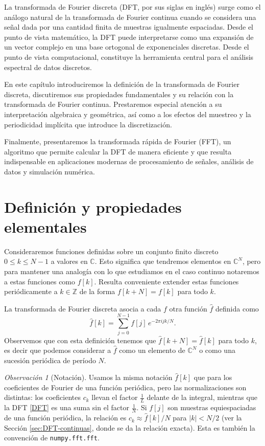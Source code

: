 \documentclass[12pt, a4paper]{amsbook}
\newcommand{\Z}{{\mathbb Z}}
\newcommand{\C}{{\mathbb C}}
\theoremstyle{remark}
\newtheorem{obs}[teo]{Observación}
\theoremstyle{definition}
\numberwithin{section}{chapter}
\numberwithin{subsection}{section}
\numberwithin{equation}{section}
\numberwithin{figure}{chapter}
\begin{document}
La transformada de Fourier discreta (DFT, por sus siglas en inglés) surge como el análogo natural de la transformada de Fourier continua cuando se considera una señal dada por una cantidad finita de muestras igualmente espaciadas. Desde el punto de vista matemático, la DFT puede interpretarse como una expansión de un vector complejo en una base ortogonal de exponenciales discretas. Desde el punto de vista computacional, constituye la herramienta central para el análisis espectral de datos discretos.

En este capítulo introduciremos la definición de la transformada de Fourier discreta, discutiremos sus propiedades fundamentales y su relación con la transformada de Fourier continua. Prestaremos especial atención a su interpretación algebraica y geométrica, así como a los efectos del muestreo y la periodicidad implícita que introduce la discretización.

Finalmente, presentaremos la transformada rápida de Fourier (FFT), un algoritmo que permite calcular la DFT de manera eficiente y que resulta indispensable en aplicaciones modernas de procesamiento de señales, análisis de datos y simulación numérica.

\section{Definición y propiedades elementales}


Consideraremos funciones definidas sobre un conjunto finito discreto $0\le k\le N-1$ a valores en $\C$. Esto significa que tendremos elementos en $\C^N$, pero para mantener una analogía con lo que estudiamos en el caso continuo notaremos a estas funciones como $f[k]$. Resulta conveniente extender estas funciones periódicamente a $k\in\Z$ de la forma $f[k+N]=f[k]$ para todo $k$.

La transformada de Fourier discreta asocia a cada $f$ otra función $\hat f$ definida como
\begin{equation}\label{DFT}
\hat f[k] = \sum_{j=0}^{N-1} f[j]\, e^{-2\pi i jk/N}.
\end{equation}
Observemos que con esta definición tenemos que $\hat f[k+N] = \hat f[k]$ para todo $k$, es decir que podemos considerar a $\hat f$ como un elemento de $\C^N$ o como una sucesión periódica de período $N$.

\begin{obs}[Notación]
Usamos la misma notación $\hat f[k]$ que para los coeficientes de Fourier de una función periódica, pero las normalizaciones son distintas: los coeficientes $c_k$ llevan el factor $\frac1L$ delante de la integral, mientras que la DFT \eqref{DFT} es una suma sin el factor $\frac1N$. Si $f[j]$ son muestras equiespaciadas de una función periódica, la relación es $c_k\approx \hat f[k]/N$ para $|k|<N/2$ (ver la Sección \ref{sec:DFT-continuas}, donde se da la relación exacta). Esta es también la convención de \texttt{numpy.fft.fft}.
\end{obs}
\end{document}
